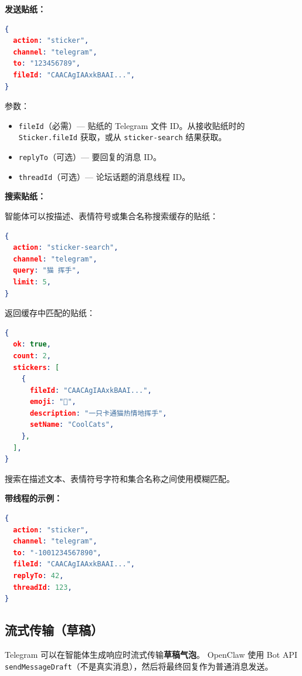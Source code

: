 \textbf{发送贴纸：}

\begin{lstlisting}[language=json]
{
  action: "sticker",
  channel: "telegram",
  to: "123456789",
  fileId: "CAACAgIAAxkBAAI...",
}
\end{lstlisting}


参数：

\begin{itemize}
  \item \texttt{fileId}（必需）— 贴纸的 Telegram 文件 ID。从接收贴纸时的 \texttt{Sticker.fileId} 获取，或从 \texttt{sticker-search} 结果获取。
  \item \texttt{replyTo}（可选）— 要回复的消息 ID。
  \item \texttt{threadId}（可选）— 论坛话题的消息线程 ID。
\end{itemize}


\textbf{搜索贴纸：}

智能体可以按描述、表情符号或集合名称搜索缓存的贴纸：

\begin{lstlisting}[language=json]
{
  action: "sticker-search",
  channel: "telegram",
  query: "猫 挥手",
  limit: 5,
}
\end{lstlisting}


返回缓存中匹配的贴纸：

\begin{lstlisting}[language=json]
{
  ok: true,
  count: 2,
  stickers: [
    {
      fileId: "CAACAgIAAxkBAAI...",
      emoji: "👋",
      description: "一只卡通猫热情地挥手",
      setName: "CoolCats",
    },
  ],
}
\end{lstlisting}


搜索在描述文本、表情符号字符和集合名称之间使用模糊匹配。

\textbf{带线程的示例：}

\begin{lstlisting}[language=json]
{
  action: "sticker",
  channel: "telegram",
  to: "-1001234567890",
  fileId: "CAACAgIAAxkBAAI...",
  replyTo: 42,
  threadId: 123,
}
\end{lstlisting}


\subsection{流式传输（草稿）}


Telegram 可以在智能体生成响应时流式传输\textbf{草稿气泡}。
OpenClaw 使用 Bot API \texttt{sendMessageDraft}（不是真实消息），然后将最终回复作为普通消息发送。

